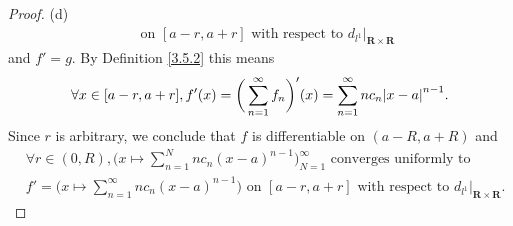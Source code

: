 \begin{proof}{(d)}
\begin{align*}
         & \text{ on } [a - r, a + r] \text{ with respect to } d_{l^1}|_{\mathbf{R} \times \mathbf{R}}
    \end{align*}
    and \(f' = g\).
    By Definition \ref{3.5.2} this means
    \[
        \forall x \in [a - r, a + r], f'(x) = \bigg(\sum_{n = 1}^\infty f_n\bigg)'(x) = \sum_{n = 1}^\infty n c_n \abs*{x - a}^{n - 1}.
    \]
    Since \(r\) is arbitrary, we conclude that \(f\) is differentiable on \((a - R, a + R)\) and
    \begin{align*}
         & \forall r \in (0, R), \bigg(x \mapsto \sum_{n = 1}^N n c_n (x - a)^{n - 1}\bigg)_{N = 1}^\infty \text{ converges uniformly to }                                   \\
         & f' = \bigg(x \mapsto \sum_{n = 1}^\infty n c_n (x - a)^{n - 1}\bigg) \text{ on } [a - r, a + r] \text{ with respect to } d_{l^1}|_{\mathbf{R} \times \mathbf{R}}.
    \end{align*}
\end{proof}

